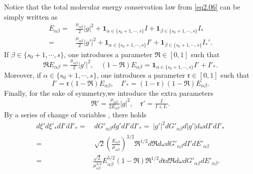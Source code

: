 \documentclass[reqno,11pt]{amsart}
\numberwithin{equation}{section}
\begin{document}
Notice that the total molecular energy conservation law from \eqref{eq2.06} can be simply written as
\begin{equation}\label{Eab}
    \begin{aligned}
        E_{\alpha \beta } = & \tfrac{\mu_{\alpha \beta } }{2} |g|^2+ \mathbf{1}_{ \alpha \in \{ s_0 + 1, \cdots, s \} } I + \mathbf{1}_{ \beta \in \{ s_0 + 1, \cdots, s \} }  I_* \\
        = & \tfrac{\mu_{\alpha \beta } }{2} |g'|^2+ \mathbf{1}_{ \alpha \in \{ s_0 + 1, \cdots, s \} } I' + \mathbf{1}_{ \beta \in \{ s_0 + 1, \cdots, s \} }  I_*'.
    \end{aligned}
\end{equation}
If $\beta \in \{s_0 + 1, \cdots , s\}$, one introduces a parameter $\mathfrak{R} \in [0,1]$ such that 
\begin{equation}\label{IR}
	\mathfrak{R} E_{\alpha \beta } =\tfrac{\mu _{\alpha \beta }}{2} |g'|^2, \quad (1- \mathfrak{R}) E_{\alpha \beta } = \mathbf{1}_{ \alpha \in \{ s_0 + 1, \cdots, s \} } I' + I'_*.
\end{equation}
Moreover, if $\alpha \in \{s_0 + 1, \cdots , s\} $, one introduces a parameter $\mathfrak{r} \in [0,1]$ such that 
\begin{equation}\label{Ir}
	I'=\mathfrak{r}(1-\mathfrak{R})E_{\alpha \beta }, \quad I'_* =(1-\mathfrak{r})(1-\mathfrak{R})E_{\alpha \beta }.
\end{equation}
Finally, for the sake of symmetry,we introduce the extra parameters
\begin{equation*}
	\mathfrak{R}' =\tfrac{\mu _{\alpha \beta }}{2 E_{\alpha \beta }} |g|^2,\quad  \mathfrak{r}'=\tfrac{I}{I+I_*}.
\end{equation*}
By a series of change of variables \cite{N.Bernhoff-2023}, there holds
\begin{equation*}
	\begin{aligned}
		d\xi' d\xi'_*dI'dI'_* 
		=&\ dG'_{\alpha \beta } dg' dI'dI'_* = \ |g'|^2 dG'_{\alpha \beta } d|g'|d\omega dI'dI'_* \\
		=& \ \sqrt{2} (\tfrac{E_{\alpha \beta }}{\mu_{\alpha \beta } })^{3/2} \mathfrak{R}^{1/2} d\mathfrak{R}d\omega dG'_{\alpha \beta } dI'dE'_{\alpha \beta } \\
		=& \tfrac{\sqrt{2} }{\mu_{\alpha \beta }^{3/2}} E_{\alpha \beta }^{5/2} (1-\mathfrak{R})\mathfrak{R}^{1/2} d\mathfrak{r}d\mathfrak{R}d\omega dG'_{\alpha \beta } dE'_{\alpha \beta }.
	\end{aligned}
\end{equation*}
\end{document}
